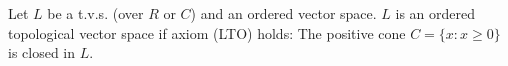 Let $L$ be a t.v.s. (over $R$ or $C$) and an ordered vector space. $L$ is an ordered topological vector space if axiom (LTO) holds: The positive cone $C = \{x: x \geq 0\}$ is closed in $L$.
